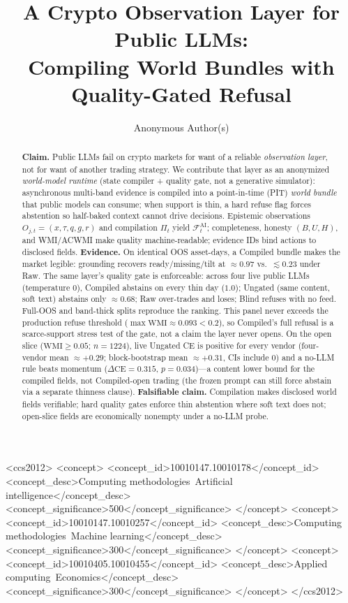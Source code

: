\documentclass[sigconf,anonymous]{acmart}
\author{Anonymous Author(s)}
\affiliation{%
  \institution{Anonymous Institution}
  \country{}}
\theoremstyle{acmdefinition}%
\theoremstyle{acmplain}%
\begin{document}
\title[Crypto Observation Layer for Public LLMs]{%
  A Crypto Observation Layer for Public LLMs:\texorpdfstring{\\}{ }%
  Compiling World Bundles with Quality-Gated Refusal}

\begin{abstract}
\textbf{Claim.} Public LLMs fail on crypto markets for want of a reliable \emph{observation layer}, not for want of another trading strategy.
We contribute that layer as an anonymized \emph{world-model runtime} (state compiler + quality gate, not a generative simulator): asynchronous multi-band evidence is compiled into a point-in-time (PIT) \emph{world bundle} that public models can consume; when support is thin, a hard refuse flag forces abstention so half-baked context cannot drive decisions.
Epistemic observations \(O_{j,t}=(x,\tau,q,g,r)\) and compilation \(\Pi_t\) yield \(\mathcal{F}^{\mathrm{AI}}_t\); completeness, honesty \((B,U,H)\), and WMI/ACWMI make quality machine-readable; evidence IDs bind actions to disclosed fields.
\textbf{Evidence.} On identical OOS asset-days, a Compiled bundle makes the market legible: grounding recovers ready/missing/tilt at \({\approx}0.97\) vs.\ \({\lesssim}0.23\) under Raw.
The same layer's quality gate is enforceable: across four live public LLMs (temperature \(0\)), Compiled abstains on every thin day (\(1.0\)); Ungated (same content, soft text) abstains only \({\approx}0.68\); Raw over-trades and loses; Blind refuses with no feed.
Full-OOS and band-thick splits reproduce the ranking.
This panel never exceeds the production refuse threshold (\(\max\mathrm{WMI}\approx 0.093{<}0.2\)), so Compiled's full refusal is a scarce-support stress test of the gate, not a claim the layer never opens.
On the open slice (\(\mathrm{WMI}\ge 0.05\); \(n{=}1224\)), live Ungated CE is positive for every vendor (four-vendor mean \({\approx}{+}0.29\); block-bootstrap mean \({\approx}{+}0.31\), CIs include 0) and a no-LLM rule beats momentum (\(\Delta\mathrm{CE}{=}0.315\), \(p{=}0.034\))---a content lower bound for the compiled fields, not Compiled-open trading (the frozen prompt can still force abstain via a separate thinness clause).
\textbf{Falsifiable claim.} Compilation makes disclosed world fields verifiable; hard quality gates enforce thin abstention where soft text does not; open-slice fields are economically nonempty under a no-LLM probe.
\end{abstract}

\begin{CCSXML}
<ccs2012>
 <concept>
  <concept_id>10010147.10010178</concept_id>
  <concept_desc>Computing methodologies~Artificial intelligence</concept_desc>
  <concept_significance>500</concept_significance>
 </concept>
 <concept>
  <concept_id>10010147.10010257</concept_id>
  <concept_desc>Computing methodologies~Machine learning</concept_desc>
  <concept_significance>300</concept_significance>
 </concept>
 <concept>
  <concept_id>10010405.10010455</concept_id>
  <concept_desc>Applied computing~Economics</concept_desc>
  <concept_significance>300</concept_significance>
 </concept>
</ccs2012>
\end{CCSXML}
\end{document}
